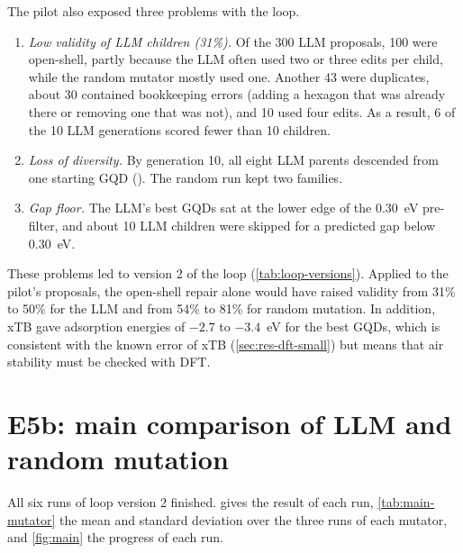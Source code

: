 The pilot also exposed three problems with the loop.
\begin{enumerate}
  \item \emph{Low validity of LLM children (31\%).} Of the 300 LLM proposals, 100 were
        open-shell, partly because the LLM often used two or three edits per child, while the
        random mutator mostly used one. Another 43 were duplicates, about 30 contained bookkeeping
        errors (adding a hexagon that was already there or removing one that was not), and 10 used
        four edits. As a result, 6 of the 10 LLM generations scored fewer than 10 children.
  \item \emph{Loss of diversity.} By generation 10, all eight LLM parents descended from one
        starting GQD (). The random run kept two families.
  \item \emph{Gap floor.} The LLM's best GQDs sat at the lower edge of the 0.30~eV pre-filter, and
        about 10 LLM children were skipped for a predicted gap below 0.30~eV.
\end{enumerate}
These problems led to version 2 of the loop (\cref{tab:loop-versions}). Applied to the pilot's
proposals, the open-shell repair alone would have raised validity from 31\% to 50\% for the LLM
and from 54\% to 81\% for random mutation. In addition, xTB gave  adsorption energies of
\(-2.7\) to \(-3.4\)~eV for the best GQDs, which is consistent with the known  error of xTB
(\cref{sec:res-dft-small}) but means that air stability must be checked with DFT.

\section{E5b: main comparison of LLM and random mutation}
\label{sec:res-main}

All six runs of loop version 2 finished.  gives the result of each run,
\cref{tab:main-mutator} the mean and standard deviation over the three runs of each mutator, and
\cref{fig:main} the progress of each run.

